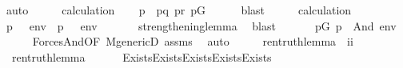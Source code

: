 \begin{isabellebody}
\ auto\isanewline
\ \ \isamarkupfalse%
\ \isamarkupfalse%
\ calculation\isanewline
\ \ \isamarkupfalse%
\ p\ \ {\isachardoublequoteopen}p{\isasympreceq}q{\isachardoublequoteclose}\ {\isachardoublequoteopen}p{\isasympreceq}r{\isachardoublequoteclose}\ {\isachardoublequoteopen}p{\isasymin}G{\isachardoublequoteclose}\isanewline
\ \ \ \ \isamarkupfalse%
\ blast\isanewline
\ \ \isamarkupfalse%
\ \isamarkupfalse%
\ calculation\isanewline
\ \ \isamarkupfalse%
\ {\isachardoublequoteopen}{\isacharparenleft}{\kern0pt}p\ {\isasymtturnstile}\ {\isasymphi}\ env{\isacharparenright}{\kern0pt}\ {\isasymand}\ {\isacharparenleft}{\kern0pt}p\ {\isasymtturnstile}\ {\isasympsi}\ env{\isacharparenright}{\kern0pt}{\isachardoublequoteclose}\ \isanewline
\ \ \ \ \isamarkupfalse%
\ strengthening{\isacharunderscore}{\kern0pt}lemma\ \isamarkupfalse%
\ {\isacharparenleft}{\kern0pt}blast{\isacharparenright}{\kern0pt}\isanewline
\ \ \isamarkupfalse%
\isanewline
\ \ \isamarkupfalse%
\ {\isachardoublequoteopen}{\isasymexists}p{\isasymin}G{\isachardot}{\kern0pt}\ {\isacharparenleft}{\kern0pt}p\ {\isasymtturnstile}\ And{\isacharparenleft}{\kern0pt}{\isasymphi}{\isacharcomma}{\kern0pt}{\isasympsi}{\isacharparenright}{\kern0pt}\ env{\isacharparenright}{\kern0pt}{\isachardoublequoteclose}\isanewline
\ \ \ \ \isamarkupfalse%
\ Forces{\isacharunderscore}{\kern0pt}And{\isacharbrackleft}{\kern0pt}OF\ M{\isacharunderscore}{\kern0pt}genericD\ assms{\isacharparenleft}{\kern0pt}{}{\isacharminus}{\kern0pt}{}{\isacharparenright}{\kern0pt}{\isacharbrackright}{\kern0pt}\ \isamarkupfalse%
\ auto\isanewline
{}\isamarkupfalse%
%
\endisatagproof
{\isafoldproof}%
%
\isadelimproof
\ \isanewline
%
\endisadelimproof
\isanewline
{}\isamarkupfalse%
\ \isanewline
\ \ ren{\isacharunderscore}{\kern0pt}truth{\isacharunderscore}{\kern0pt}lemma\ {\isacharcolon}{\kern0pt}{\isacharcolon}{\kern0pt}\ {\isachardoublequoteopen}i{\isasymRightarrow}i{\isachardoublequoteclose}\ \isanewline
\ \ {\isachardoublequoteopen}ren{\isacharunderscore}{\kern0pt}truth{\isacharunderscore}{\kern0pt}lemma{\isacharparenleft}{\kern0pt}{\isasymphi}{\isacharparenright}{\kern0pt}\ {\isasymequiv}\ \isanewline
\ \ \ \ Exists{\isacharparenleft}{\kern0pt}Exists{\isacharparenleft}{\kern0pt}Exists{\isacharparenleft}{\kern0pt}Exists{\isacharparenleft}{\kern0pt}Exists{\isacharparenleft}{\kern0pt}\isanewline

\end{isabellebody}
